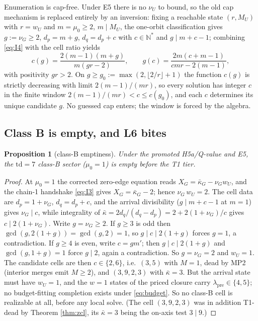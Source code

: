 \documentclass[11pt]{article}
\newtheorem{proposition}[theorem]{Proposition}
\theoremstyle{definition}
\theoremstyle{remark}
\newcommand{\kb}{\bar\kappa}
\begin{document}
Enumeration is cap-free. Under E5 there is no $\nu_U$ to bound, so the old cap mechanism is replaced entirely by an inversion: fixing a reachable state $(r,M_U)$ with $r=w_U$ and $m=\mu_0\geq2$, $m\mid M_U$, the one-orbit classification gives $g:=\nu_G\geq2$, $d_p=m+g$, $d_q=d_p+c$ with $c\in\mathbb{N}^{*}$ and $g\mid m+c-1$; combining \eqref{eq:I4} with the cell ratio yields
\[
c(g)=\frac{2(m-1)(m+g)}{m(gr-2)},\qquad g(c)=\frac{2m(c+m-1)}{cmr-2(m-1)} ,
\]
with positivity $gr>2$. On $g\geq g_0:=\max(2,\lfloor2/r\rfloor+1)$ the function $c(g)$ is strictly decreasing with limit $2(m-1)/(mr)$, so every solution has integer $c$ in the finite window $2(m-1)/(mr)<c\leq c(g_0)$, and each $c$ determines its unique candidate $g$. No guessed cap enters; the window is forced by the algebra.

\subsection{Class B is empty, and L6 bites}

\begin{proposition}[class-B emptiness]\label{prop:classB}
Under the promoted H5a/Q-value and E5, the $\mathrm{td}=7$ class-B sector ($\mu_0=1$) is empty before the T1 tier.
\end{proposition}

\begin{proof}
At $\mu_0=1$ the corrected zero-edge equation reads $X_G=\kb_G-\nu_G w_U$, and the chain-1 handshake \eqref{eq:I3} gives $X_G=\kb_G-2$; hence $\nu_G\,w_U=2$. The cell data are $d_p=1+\nu_G$, $d_q=d_p+c$, and the arrival divisibility ($g\mid m+c-1$ at $m=1$) gives $\nu_G\mid c$, while integrality of $\kb=2d_q/(d_q-d_p)=2+2(1+\nu_G)/c$ gives $c\mid 2(1+\nu_G)$. Write $g=\nu_G\geq2$. If $g\geq3$ is odd then $\gcd(g,2(1+g))=\gcd(g,2)=1$, so $g\mid c\mid 2(1+g)$ forces $g=1$, a contradiction. If $g\geq4$ is even, write $c=gm'$; then $g\mid c\mid 2(1+g)$ and $\gcd(g,1+g)=1$ force $g\mid2$, again a contradiction. So $g=\nu_G=2$ and $w_U=1$. The candidate cells are then $c\in\{2,6\}$, i.e.\ $(3,5)$ with $M=1$, dead by MP2 (interior merges emit $M\geq2$), and $(3,9,2,3)$ with $\kb=3$. But the arrival state must have $w_U=1$, and the $w=1$ states of the priced closure carry $\lambda_{\mathrm{pre}}\in\{4,5\}$; no budget-fitting completion exists under \eqref{eq:budget}. So no class-B cell is realizable at all, before any local solve. (The cell $(3,9,2,3)$ was in addition T1-dead by Theorem \ref{thm:zcl}, its $\kb=3$ being the on-axis test $3\mid9$.)
\end{proof}
\end{document}
